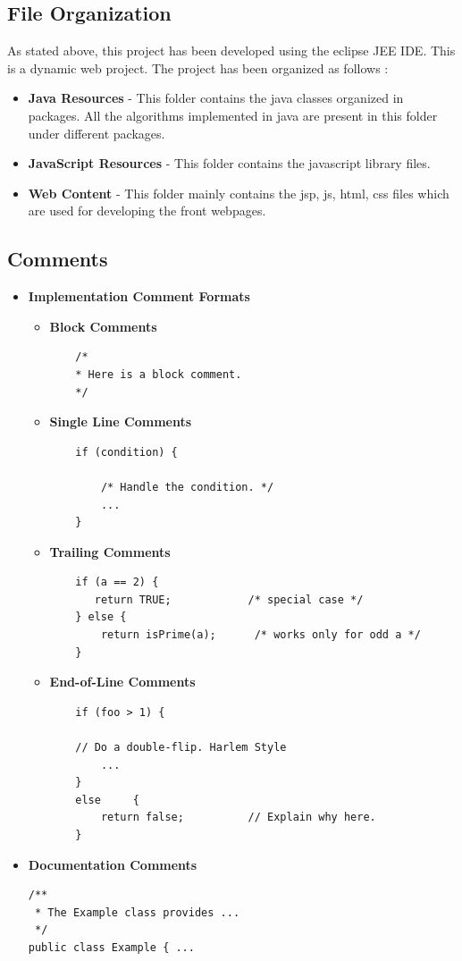 \documentclass[12pt,a4paper]{report}
\begin{document}
\subsection{File Organization}
As stated above, this project has been developed using the eclipse JEE IDE. This is a dynamic web project. The project has been organized as follows :
\begin{itemize}
\item\textbf{Java Resources} - This folder contains the java classes organized in packages. All the algorithms implemented in java are present in this folder under different packages.
\item\textbf{JavaScript Resources} - This folder contains the javascript library files.
\item\textbf{Web Content} - This folder mainly contains the jsp, js, html, css files which are used for developing the front webpages.
\end{itemize}

\subsection{Comments}
\begin{itemize}
\item{\textbf{Implementation Comment Formats}}
	\begin{itemize}
	\item \textbf{Block Comments}
	\begin{verbatim}
	/*
 	* Here is a block comment.
 	*/
	\end{verbatim}
	\item \textbf{Single Line Comments}
	\begin{verbatim}
	if (condition) {

    	/* Handle the condition. */
    	...
	}

	\end{verbatim}
	\item \textbf{Trailing Comments}
	\begin{verbatim}
	if (a == 2) {
 	   return TRUE;            /* special case */
	} else {
	    return isPrime(a);      /* works only for odd a */
	}
	\end{verbatim}
	\item \textbf{End-of-Line Comments}
	\begin{verbatim}
	if (foo > 1) {

    // Do a double-flip. Harlem Style
    	...
	}
	else	 {
    	return false;          // Explain why here.	
	}
	\end{verbatim}
	\end{itemize}
\item{\textbf{Documentation Comments}}
\begin{verbatim}
/**
 * The Example class provides ...
 */
public class Example { ...
\end{verbatim}

\end{itemize}
\end{document}

